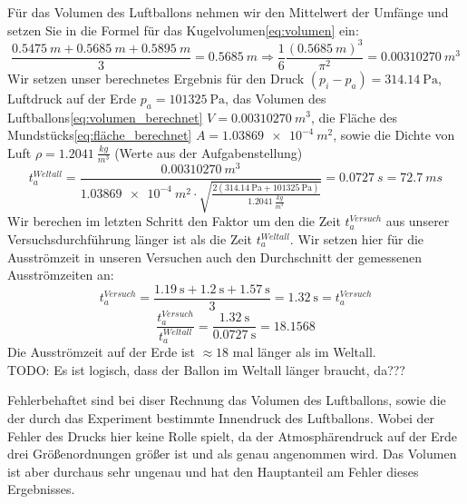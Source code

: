 \documentclass{article}
\begin{document}
        Für das Volumen des Luftballons nehmen wir den Mittelwert der Umfänge und setzen Sie in die Formel für das Kugelvolumen\ref{eq:volumen} ein:
        \begin{equation} \label{eq:volumen_berechnet}
            \frac{ \SI{0.5475}{m} + \SI{0.5685}{m} + \SI{0.5895}{m} }{3} = \SI{0.5685}{m} \Rightarrow \frac{1}{6} \frac{ {\left( \SI{0.5685}{m} \right)}^3}{\pi^2} = \SI{0.00310270}{m^3}
        \end{equation}
        Wir setzen unser berechnetes Ergebnis für den Druck \(\left(p_i - p_a\right) = \SI{314.14}{\pascal} \), Luftdruck auf der Erde \(p_a = \SI{101325}{\pascal} \),
        das Volumen des Luftballons\ref{eq:volumen_berechnet} \(V = \SI{0.00310270}{m^3}\),
        die Fläche des Mundstücks\ref{eq:fläche_berechnet} \( A = \SI{1.03869e-4}{m^2} \),
        sowie die Dichte von Luft \( \rho = \SI{1.2041}{\frac{kg}{m^3}} \) (Werte aus der Aufgabenstellung\cite{AnleitungPraktikum})
        \begin{equation}
            t_a^{Weltall} = \frac{ \SI{0.00310270}{m^3} }{ \SI{1.03869e-4}{m^2} \cdot \sqrt{ \frac{ 2(\SI{314.14}{\pascal} + \SI{101325}{\pascal})}{ \SI{1.2041}{\frac{kg}{m^3}} }} }
             = \SI{0.0727}{s} = \SI{72.7}{ms}
        \end{equation}
        Wir berechen im letzten Schritt den Faktor um den die Zeit \(t_a^{Versuch}\) aus unserer Versuchsdurchführung länger ist als die Zeit \(t_a^{Weltall}\).
        Wir setzen hier für die Ausströmzeit in unseren Versuchen auch den Durchschnitt der gemessenen Ausströmzeiten an:
        \begin{equation}
            t_a^{Versuch} = \frac{ \SI{1.19}{\second} + \SI{1.2}{\second} + \SI{1.57}{\second} }{3} = \SI{1.32}{\second} = t_a^{Versuch}
        \end{equation}
        \begin{equation}
            \frac{t_a^{Versuch}}{t_a^{Weltall}} = \frac{ \SI{1.32}{\second} }{ \SI{0.0727}{\second} } = 18.1568
        \end{equation}
        Die Ausströmzeit auf der Erde ist \(\approx 18\) mal länger als im Weltall. \\
        TODO: Es ist logisch, dass der Ballon im Weltall länger braucht, da???

        Fehlerbehaftet sind bei diser Rechnung das Volumen des Luftballons, sowie die der durch das Experiment bestimmte Innendruck des Luftballons.
        Wobei der Fehler des Drucks hier keine Rolle spielt, da der Atmosphärendruck auf der Erde drei Größenordnungen größer ist und als genau angenommen wird.
        Das Volumen ist aber durchaus sehr ungenau und hat den Hauptanteil am Fehler dieses Ergebnisses.
    
\end{document}
